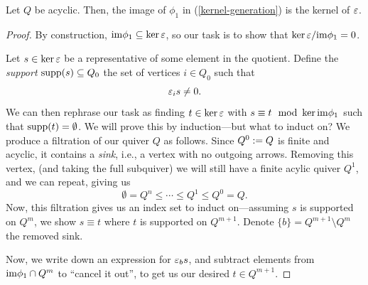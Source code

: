 \documentclass[12pt]{article}
\begin{document}
\begin{prop}
    Let $Q$ be acyclic. Then, the image of $\phi_1$ in (\ref{kernel-generation}) is the kernel of $\varepsilon$.
\end{prop}
\begin{proof}
    By construction, $\im \phi_1 \subseteq \ker \eps$, so our task is to show that $\ker \eps/\im \phi_1 = 0$. 
    
    Let $s\in \ker \varepsilon$ be a representative of some element in the quotient. Define the \textit{support} $\operatorname{supp}(s) \subseteq Q_0$ the set of vertices $i\in Q_0$ such that
    \[\varepsilon_i s \neq 0.\]
    We can then rephrase our task as finding $t \in \ker \varepsilon$ with $s\equiv t \mod \ker \im \phi_1$ such that $\operatorname{supp}(t)=\emptyset$. We will prove this by induction---but what to induct on? We produce a filtration of our quiver $Q$ as follows. Since $Q^0 := Q$ is finite and acyclic, it contains a \textit{sink}, i.e., a vertex with no outgoing arrows. Removing this vertex, (and taking the full subquiver) we will still have a finite acylic quiver $Q^1$, and we can repeat, giving us
    \[\emptyset = Q^n \leq \cdots \leq Q^1 \leq Q^0 = Q.\]
    Now, this filtration gives us an index set to induct on---assuming $s$ is supported on $Q^m$, we show $s\equiv t$ where $t$ is supported on $Q^{m+1}$. Denote $\{b\} = Q^{m+1}\setminus Q^m$ the removed sink.

    Now, we write down an expression for $\varepsilon_b s$, and subtract elements from $\im \phi_1 \cap Q^m$ to ``cancel it out'', to get us our desired $t\in Q^{m+1}$.


\end{proof}
\end{document}

